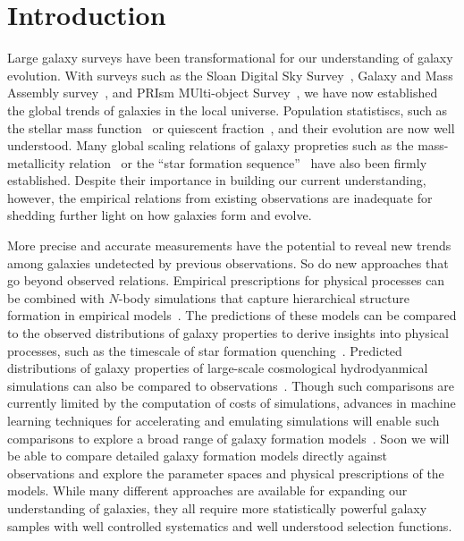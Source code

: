 \section{Introduction} \label{sec:intro} 
Large galaxy surveys have been transformational for our understanding of galaxy
evolution. 
With surveys such as the Sloan Digital Sky Survey~\citep[SDSS;][]{york2000},
Galaxy and Mass Assembly survey~\citep[GAMA;][]{driver2011}, and 
PRIsm MUlti-object Survey~\citep[PRIMUS;][]{coil2011}, 
we have now established the global trends of galaxies in the local universe. 
Population statistiscs, such as the stellar mass 
function~\citep{li2009, marchesini2009, moustakas2013} or quiescent
fraction~\citep{kauffmann2003a, blanton2003, baldry2006, taylor2009}, and their
evolution are now well understood. 
Many global scaling relations of galaxy propreties such as the mass-metallicity
relation~\citep{tremonti2004} or
the ``star formation sequence''~\citep{noeske2007, daddi2007,
salim2007} have
also been firmly established. 
Despite their importance in building our current understanding, however,
the empirical relations from existing observations are inadequate for
shedding further light on how galaxies form and evolve.

More precise and accurate measurements have the potential to reveal new trends
among galaxies undetected by previous observations.
So do new approaches that go beyond observed relations.
Empirical prescriptions for physical processes can be combined with $N$-body
simulations that capture hierarchical structure formation in empirical 
models~\citep[\emph{e.g.} {\sc UniverseMachine};][]{behroozi2019}. 
The predictions of these models can be compared to the observed distributions
of galaxy properties to derive insights into physical processes, such as the
timescale of star formation quenching~\citep{wetzel2013, hahn2017, tinker2017}. 
Predicted distributions of galaxy properties of large-scale cosmological 
hydrodyanmical simulations can also be compared to 
observations~\citep[\emph{e.g.}][]{genel2014, somerville2015a, dave2017a,
trayford2017, dickey2021, donnari2021}.
Though such comparisons are currently limited by the computation of costs of
simulations, advances in machine learning techniques for accelerating and
emulating simulations will enable such comparisons to explore a broad range of
galaxy formation models~\citep[\emph{e.g.}][]{villaescusa-navarro2021}.
Soon we will be able to compare detailed galaxy formation models directly
against observations and explore the parameter spaces and physical
prescriptions of the models. 
While many different approaches are available for expanding our understanding
of galaxies, they all require more statistically powerful galaxy samples with
well controlled systematics and well understood selection functions. 

